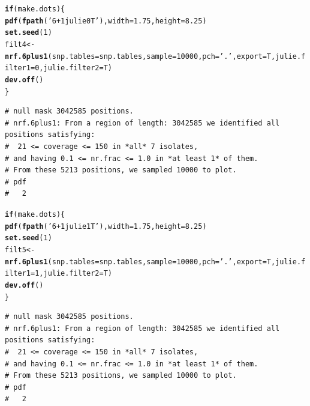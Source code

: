 \documentclass{article}\usepackage[]{graphicx}\usepackage[]{color}
\makeatletter
\newcommand{\hlnum}[1]{\textcolor[rgb]{0.686,0.059,0.569}{#1}}%
\newcommand{\hlstr}[1]{\textcolor[rgb]{0.192,0.494,0.8}{#1}}%
\newcommand{\hlstd}[1]{\textcolor[rgb]{0.345,0.345,0.345}{#1}}%
\newcommand{\hlkwa}[1]{\textcolor[rgb]{0.161,0.373,0.58}{\textbf{#1}}}%
\newcommand{\hlkwb}[1]{\textcolor[rgb]{0.69,0.353,0.396}{#1}}%
\newcommand{\hlkwc}[1]{\textcolor[rgb]{0.333,0.667,0.333}{#1}}%
\newcommand{\hlkwd}[1]{\textcolor[rgb]{0.737,0.353,0.396}{\textbf{#1}}}%
\newenvironment{kframe}{%
 \def\at@end@of@kframe{}%
 \ifinner\ifhmode%
  \def\at@end@of@kframe{\end{minipage}}%
  \begin{minipage}{\columnwidth}%
 \fi\fi%
 \def\FrameCommand##1{\hskip\@totalleftmargin \hskip-\fboxsep
 \colorbox{shadecolor}{##1}\hskip-\fboxsep
     \hskip-\linewidth \hskip-\@totalleftmargin \hskip\columnwidth}%
 \MakeFramed {\advance\hsize-\width
   \@totalleftmargin\z@ \linewidth\hsize
   \@setminipage}}%
 {\par\unskip\endMakeFramed%
 \at@end@of@kframe}
\newenvironment{knitrout}{}{} %
\makeatother
\begin{document}
\begin{knitrout}\footnotesize
{}\color{fgcolor}\begin{kframe}
\begin{alltt}
\hlkwa{if}\hlstd{(make.dots)\{}
  \hlkwd{pdf}\hlstd{(}\hlkwd{fpath}\hlstd{(}\hlstr{'6+1julie0T'}\hlstd{),} \hlkwc{width}\hlstd{=}\hlnum{1.75}\hlstd{,} \hlkwc{height}\hlstd{=}\hlnum{8.25}\hlstd{)}
  \hlkwd{set.seed}\hlstd{(}\hlnum{1}\hlstd{)}
  \hlstd{filt4} \hlkwb{<-} \hlkwd{nrf.6plus1}\hlstd{(}\hlkwc{snp.tables}\hlstd{=snp.tables,}\hlkwc{sample}\hlstd{=}\hlnum{10000}\hlstd{,}\hlkwc{pch}\hlstd{=}\hlstr{'.'}\hlstd{,}\hlkwc{export}\hlstd{=T,}\hlkwc{julie.filter1}\hlstd{=}\hlnum{0}\hlstd{,}\hlkwc{julie.filter2}\hlstd{=T)}
  \hlkwd{dev.off}\hlstd{()}
\hlstd{\}}
\end{alltt}
\begin{verbatim}
# null mask 3042585 positions.
# nrf.6plus1: From a region of length: 3042585 we identified all positions satisfying: 
#  21 <= coverage <= 150 in *all* 7 isolates, 
# and having 0.1 <= nr.frac <= 1.0 in *at least 1* of them. 
# From these 5213 positions, we sampled 10000 to plot.
# pdf 
#   2
\end{verbatim}
\end{kframe}
\end{knitrout}
\begin{knitrout}\footnotesize
{}\color{fgcolor}\begin{kframe}
\begin{alltt}
\hlkwa{if}\hlstd{(make.dots)\{}
  \hlkwd{pdf}\hlstd{(}\hlkwd{fpath}\hlstd{(}\hlstr{'6+1julie1T'}\hlstd{),} \hlkwc{width}\hlstd{=}\hlnum{1.75}\hlstd{,} \hlkwc{height}\hlstd{=}\hlnum{8.25}\hlstd{)}
  \hlkwd{set.seed}\hlstd{(}\hlnum{1}\hlstd{)}
  \hlstd{filt5} \hlkwb{<-} \hlkwd{nrf.6plus1}\hlstd{(}\hlkwc{snp.tables}\hlstd{=snp.tables,}\hlkwc{sample}\hlstd{=}\hlnum{10000}\hlstd{,}\hlkwc{pch}\hlstd{=}\hlstr{'.'}\hlstd{,}\hlkwc{export}\hlstd{=T,}\hlkwc{julie.filter1}\hlstd{=}\hlnum{1}\hlstd{,}\hlkwc{julie.filter2}\hlstd{=T)}
  \hlkwd{dev.off}\hlstd{()}
\hlstd{\}}
\end{alltt}
\begin{verbatim}
# null mask 3042585 positions.
# nrf.6plus1: From a region of length: 3042585 we identified all positions satisfying: 
#  21 <= coverage <= 150 in *all* 7 isolates, 
# and having 0.1 <= nr.frac <= 1.0 in *at least 1* of them. 
# From these 5213 positions, we sampled 10000 to plot.
# pdf 
#   2
\end{verbatim}
\end{kframe}
\end{knitrout}
\end{document}
